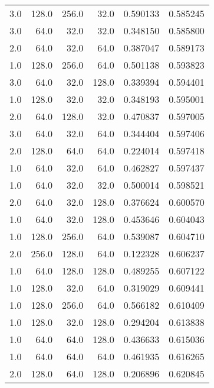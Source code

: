 \begin{longtable}{rrrrrr}
        3.0 &     128.0 &       256.0 &     32.0 &      0.590133 &    0.585245 \\
        3.0 &      64.0 &        32.0 &     32.0 &      0.348150 &    0.585800 \\
        2.0 &      64.0 &        32.0 &     64.0 &      0.387047 &    0.589173 \\
        1.0 &     128.0 &       256.0 &     64.0 &      0.501138 &    0.593823 \\
        3.0 &      64.0 &        32.0 &    128.0 &      0.339394 &    0.594401 \\
        1.0 &     128.0 &        32.0 &     32.0 &      0.348193 &    0.595001 \\
        2.0 &      64.0 &       128.0 &     32.0 &      0.470837 &    0.597005 \\
        3.0 &      64.0 &        32.0 &     64.0 &      0.344404 &    0.597406 \\
        2.0 &     128.0 &        64.0 &     64.0 &      0.224014 &    0.597418 \\
        1.0 &      64.0 &        32.0 &     64.0 &      0.462827 &    0.597437 \\
        1.0 &      64.0 &        32.0 &     32.0 &      0.500014 &    0.598521 \\
        2.0 &      64.0 &        32.0 &    128.0 &      0.376624 &    0.600570 \\
        1.0 &      64.0 &        32.0 &    128.0 &      0.453646 &    0.604043 \\
        1.0 &     128.0 &       256.0 &     64.0 &      0.539087 &    0.604710 \\
        2.0 &     256.0 &       128.0 &     64.0 &      0.122328 &    0.606237 \\
        1.0 &      64.0 &       128.0 &    128.0 &      0.489255 &    0.607122 \\
        1.0 &     128.0 &        32.0 &     64.0 &      0.319029 &    0.609441 \\
        1.0 &     128.0 &       256.0 &     64.0 &      0.566182 &    0.610409 \\
        1.0 &     128.0 &        32.0 &    128.0 &      0.294204 &    0.613838 \\
        1.0 &      64.0 &        64.0 &    128.0 &      0.436633 &    0.615036 \\
        1.0 &      64.0 &        64.0 &     64.0 &      0.461935 &    0.616265 \\
        2.0 &     128.0 &        64.0 &    128.0 &      0.206896 &    0.620845 \\

\end{longtable}
